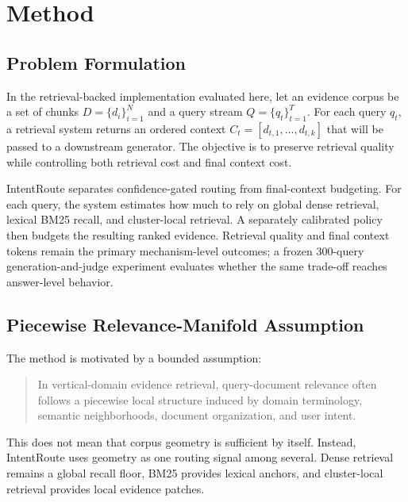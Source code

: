 
\section{Method}
\label{sec:04-method:method}

\subsection{Problem Formulation}
\label{sec:04-method:problem-formulation}

In the retrieval-backed implementation evaluated here, let an evidence corpus be a set of chunks $D = \{d_i\}_{i=1}^{N}$ and a query stream $Q = \{q_t\}_{t=1}^{T}$. For each query $q_t$, a retrieval system returns an ordered context $C_t = [d_{t,1}, \ldots, d_{t,k}]$ that will be passed to a downstream generator. The objective is to preserve retrieval quality while controlling both retrieval cost and final context cost.

IntentRoute separates confidence-gated routing from final-context budgeting. For each query, the system estimates how much to rely on global dense retrieval, lexical BM25 recall, and cluster-local retrieval. A separately calibrated policy then budgets the resulting ranked evidence. Retrieval quality and final context tokens remain the primary mechanism-level outcomes; a frozen 300-query generation-and-judge experiment evaluates whether the same trade-off reaches answer-level behavior.

\subsection{Piecewise Relevance-Manifold Assumption}
\label{sec:04-method:piecewise-relevance-manifold-assumption}

The method is motivated by a bounded assumption:

\begin{quote}
In vertical-domain evidence retrieval, query-document relevance often follows a piecewise local structure induced by domain terminology, semantic neighborhoods, document organization, and user intent.
\end{quote}

This does not mean that corpus geometry is sufficient by itself. Instead, IntentRoute uses geometry as one routing signal among several. Dense retrieval remains a global recall floor, BM25 provides lexical anchors, and cluster-local retrieval provides local evidence patches.

